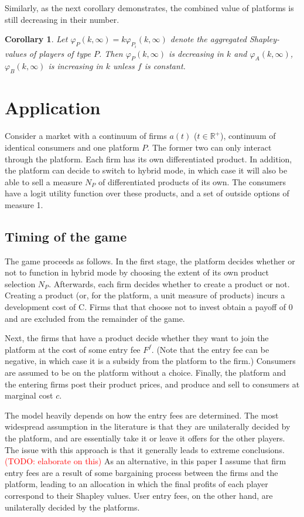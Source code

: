 \documentclass[a4paper]{article}
\newtheorem{corollary}{Corollary}
\begin{document}
Similarly, as the next corollary demonstrates, the combined value of platforms is still decreasing in their number.
\begin{corollary}
    Let $\varphi_{P}(k, \infty) = k\varphi_{P_i}(k, \infty)$ denote the aggregated Shapley-values of players of type $P$. Then $\varphi_{P}(k, \infty)$ is decreasing in $k$ and $\varphi_{A}(k, \infty)$, $\varphi_{B}(k, \infty)$ is increasing in $k$ unless $f$ is constant.
\end{corollary}


\section{Application}

Consider a market with a continuum of firms $a(t)$ ($t \in \mathbb{R}^+$), continuum of identical consumers and one platform $P$. The former two can only interact through the platform. Each firm has its own differentiated product. In addition, the platform can decide to switch to hybrid mode, in which case it will also be able to sell a measure $N_P$ of differentiated products of its own. The consumers have a logit utility function over these products, and a set of outside options of measure 1.

\subsection{Timing of the game}

The game proceeds as follows. In the first stage, the platform decides whether or not to function in hybrid mode by choosing the extent of its own product selection $N_P$. Afterwards, each firm decides whether to create a product or not. Creating a product (or, for the platform, a unit measure of products) incurs a development cost of C. Firms that that choose not to invest obtain a payoff of 0 and are excluded from the remainder of the game.

Next, the firms that have a product decide whether they want to join the platform at the cost of some entry fee $F^f$. (Note that the entry fee can be negative, in which case it is a subsidy from the platform to the firm.) Consumers are assumed to be on the platform without a choice. Finally, the platform and the entering firms post their product prices, and produce and sell to consumers at marginal cost $c$.

The model heavily depends on how the entry fees are determined. The most widespread assumption in the literature is that they are unilaterally decided by the platform, and are essentially take it or leave it offers for the other players. The issue with this approach is that it generally leads to extreme conclusions. \textcolor{red}{(TODO: elaborate on this)} As an alternative, in this paper I assume that firm entry fees are a result of some bargaining process between the firms and the platform, leading to an allocation in which the final profits of each player correspond to their Shapley values. User entry fees, on the other hand, are unilaterally decided by the platforms.
\end{document}

